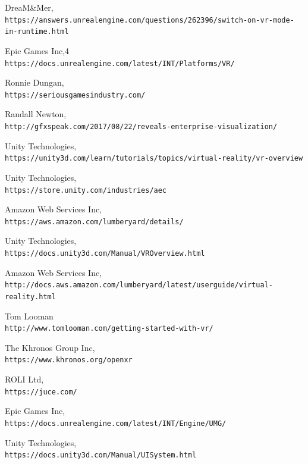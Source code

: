 \documentclass[onecolumn, draftclsnofoot,10pt, compsoc]{IEEEtran}
\begin{document}
\newpage
\begin{thebibliography}{}

DreaM\&Mer,
\\\texttt{https://answers.unrealengine.com/questions/262396/switch-on-vr-mode-in-runtime.html}

Epic Games Inc,4
\\\texttt{https://docs.unrealengine.com/latest/INT/Platforms/VR/}

Ronnie Dungan,
\\\texttt{https://seriousgamesindustry.com/}

Randall Newton,
\\\texttt{http://gfxspeak.com/2017/08/22/reveals-enterprise-visualization/}

Unity Technologies,
\\\texttt{https://unity3d.com/learn/tutorials/topics/virtual-reality/vr-overview}

Unity Technologies,
\\\texttt{https://store.unity.com/industries/aec}

Amazon Web Services Inc,
\\\texttt{https://aws.amazon.com/lumberyard/details/}

Unity Technologies,
\\\texttt{https://docs.unity3d.com/Manual/VROverview.html}

Amazon Web Services Inc,
\\\texttt{http://docs.aws.amazon.com/lumberyard/latest/userguide/virtual-reality.html}

Tom Looman
\\\texttt{http://www.tomlooman.com/getting-started-with-vr/}

The Khronos Group Inc,
\\\texttt{https://www.khronos.org/openxr}

ROLI Ltd,
\\\texttt{https://juce.com/}

Epic Games Inc,
\\\texttt{https://docs.unrealengine.com/latest/INT/Engine/UMG/}

Unity Technologies,
\\\texttt{https://docs.unity3d.com/Manual/UISystem.html}


\end{thebibliography}
\end{document}

